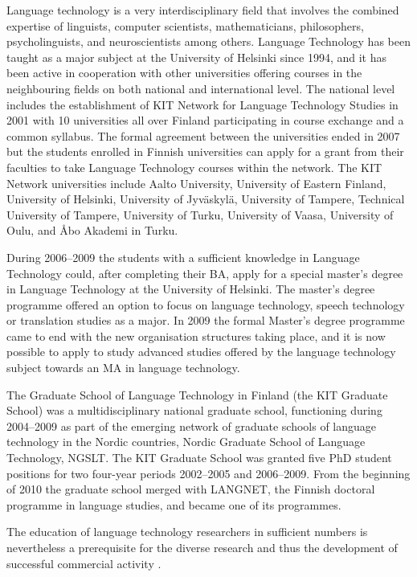 \begin{multicols}{2}
Language technology is a very interdisciplinary field that involves the combined expertise of linguists, computer scientists, mathematicians, philosophers, psycholinguists, and neuroscientists among others.  Language Technology has been taught as a major subject at the University of Helsinki since 1994, and it has been active in cooperation with other universities offering courses in the neighbouring fields on both national and international level. The national level includes the establishment of KIT Network for Language Technology Studies in 2001 with 10 universities all over Finland participating in course exchange and a common syllabus. The formal agreement between the universities ended in 2007 but the students enrolled in Finnish universities can apply for a grant from their faculties to take Language Technology courses within the network.  The KIT Network universities include Aalto University, University of Eastern Finland, University of Helsinki, University of Jyväskylä, University of Tampere, Technical University of Tampere, University of Turku, University of Vaasa, University of Oulu, and Åbo Akademi in Turku.

During 2006--2009 the students with a sufficient knowledge in Language Technology could, after completing their BA, apply for a special master's degree in Language Technology at the University of Helsinki. The master's degree programme offered an option to focus on language technology, speech technology or translation studies as a major. In 2009 the formal Master's degree programme came to end with the new organisation structures taking place, and it is now possible to apply to study advanced studies offered by the language technology subject towards an MA in language technology.

The Graduate School of Language Technology in Finland (the KIT Graduate School) was a multidisciplinary national graduate school, functioning during 2004--2009 as part of the emerging network of graduate schools of language technology in the Nordic countries, Nordic Graduate School of Language Technology, NGSLT.  The KIT Graduate School was granted five PhD student positions for two four-year periods 2002--2005 and 2006--2009. From the beginning of 2010 the graduate school merged with LANGNET, the Finnish doctoral programme in language studies, and became one of its programmes.

The education of language technology researchers in sufficient numbers is nevertheless a prerequisite for the diverse research and thus the development of successful commercial activity \cite{FinExp}.


\end{multicols}
